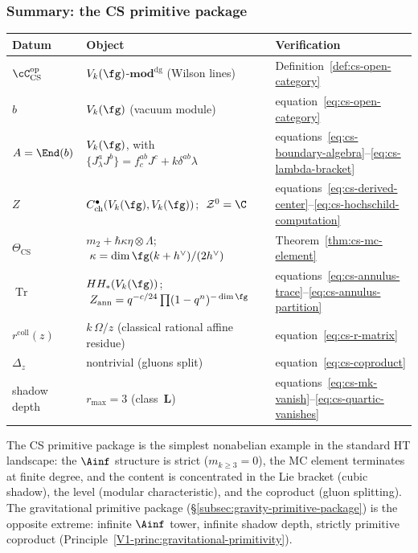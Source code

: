 \subsubsection*{Summary: the CS primitive package}

\begin{center}
\small
\renewcommand{\arraystretch}{1.15}
\begin{tabular}{lll}
\textbf{Datum} & \textbf{Object} & \textbf{Verification} \\
\hline
$\cC_{\mathrm{CS}}^{\mathrm{op}}$
 & $V_k(\fg)$-$\mathbf{mod}^{\mathrm{dg}}$ (Wilson lines)
 & Definition~\ref{def:cs-open-category} \\[2pt]
$b$
 & $V_k(\fg)$ (vacuum module)
 & equation~\eqref{eq:cs-open-category} \\[2pt]
$A = \End(b)$
 & $V_k(\fg)$, with $\{J^a_\lambda J^b\} = f^{ab}_c J^c + k\delta^{ab}\lambda$
 & equations~\eqref{eq:cs-boundary-algebra}--\eqref{eq:cs-lambda-bracket} \\[2pt]
$Z$
 & $C^\bullet_{\mathrm{ch}}(V_k(\fg), V_k(\fg))$;
 $\;\mathcal{Z}^0 = \C$
 & equations~\eqref{eq:cs-derived-center}--\eqref{eq:cs-hochschild-computation} \\[2pt]
$\Theta_{\mathrm{CS}}$
 & $m_2 + \hbar\kappa\eta\otimes\Lambda$;
 $\;\kappa = \dim\fg(k+h^\vee)/(2h^\vee)$
 & Theorem~\ref{thm:cs-mc-element} \\[2pt]
$\operatorname{Tr}$
 & $HH_*(V_k(\fg))$;
 $\;Z_{\mathrm{ann}} = q^{-c/24}\prod(1-q^n)^{-\dim\fg}$
 & equations~\eqref{eq:cs-annulus-trace}--\eqref{eq:cs-annulus-partition} \\[2pt]
$r^{\mathrm{coll}}(z)$
 & $k\,\Omega/z$ (classical rational affine residue)
 & equation~\eqref{eq:cs-r-matrix} \\[2pt]
$\Delta_z$
 & nontrivial (gluons split)
 & equation~\eqref{eq:cs-coproduct} \\[2pt]
shadow depth
 & $r_{\max} = 3$ (class~$\mathbf{L}$)
 & equations~\eqref{eq:cs-mk-vanish}--\eqref{eq:cs-quartic-vanishes}
\end{tabular}
\end{center}

The CS primitive package is the simplest nonabelian example in the standard HT landscape: the $\Ainf$ structure is strict ($m_{k \ge 3} = 0$), the MC element terminates at finite degree, and the content is concentrated in the Lie bracket (cubic shadow), the level (modular characteristic), and the coproduct (gluon splitting). The gravitational primitive package (\S\ref{subsec:gravity-primitive-package}) is the opposite extreme: infinite $\Ainf$ tower, infinite shadow depth, strictly primitive coproduct (Principle~\ref*{V1-princ:gravitational-primitivity}).

